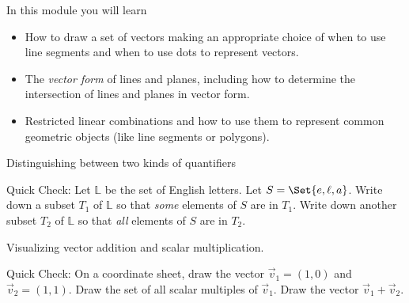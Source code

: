 \begin{module}

	In this module you will learn
	\begin{itemize}
		\item How to draw a set of vectors making an appropriate choice of when to use
			line segments and when to use dots to represent vectors.
		\item The \emph{vector form} of lines and planes, including how to determine
			the intersection of lines and planes in vector form.
		\item Restricted linear combinations and how to use them to represent common geometric
			objects (like line segments or polygons).
	\end{itemize}

	\begin{beforeyouread}
		\item Distinguishing between two kinds of quantifiers

		\item[] Quick Check: Let $\mathbb{L}$ be the set of English letters. Let $S=\Set
			{e,\ell,a}$. Write down a subset $T_{1}$ of $\mathbb{L}$ so that \emph{some}
			elements of $S$ are in $T_{1}$. Write down another subset $T_{2}$ of
			$\mathbb{L}$ so that \emph{all} elements of $S$ are in $T_{2}$.

		\item Visualizing vector addition and scalar multiplication.

		\item[] Quick Check: On a coordinate sheet, draw the vector $\vec v_{1} = (1,
			0)$ and $\vec v_{2} = (1,1)$. Draw the set of all scalar multiples of
			$\vec v_{1}$. Draw the vector $\vec v_{1} + \vec v_{2}$.
	\end{beforeyouread}

	
	

\end{module}
